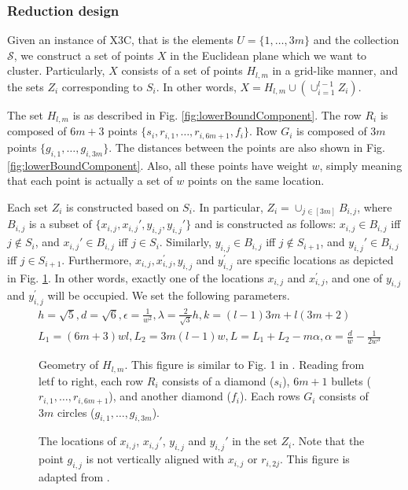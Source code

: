 \documentclass[letterpaper,12pt,titlepage,oneside,final]{book}
\newcommand{\mc}{\mathcal}
\begin{document}
\subsubsection{Reduction design}
Given an instance of X3C, that is the elements $U = \{1, \ldots, 3m\}$ and the collection $\mc S$, we construct a set of points $X$ in the Euclidean plane which we want to cluster. Particularly, $X$ consists of a set of points $H_{l,m}$ in a grid-like manner, and the sets $Z_i$ corresponding to $S_i$. In other words, $X = H_{l,m} \cup (\cup_{i=1}^{l-1} Z_i)$. 

The set $H_{l,m}$ is as described in Fig. \ref{fig:lowerBoundComponent}. The row $R_i$ is composed of $6m + 3$ points $\{s_i, r_{i, 1}, \ldots, r_{i, 6m+1}, f_i\}$. Row $G_i$ is composed of $3m$ points $\{g_{i,1}, \ldots, g_{i, 3m}\}$. The distances between the points are also shown in Fig. \ref{fig:lowerBoundComponent}. Also, all these points have weight $w$, simply meaning that each point is actually a set of $w$ points on the same location.

Each set $Z_i$ is constructed based on $S_i$. In particular, $Z_i = \cup_{j\in [3m]} B_{i,j}$, where $B_{i,j}$ is a subset of $\{x_{i,j},x_{i,j}',y_{i,j},y_{i,j}'\}$ and is constructed as follows: $x_{i,j} \in B_{i,j}$ iff $j \not\in S_i$, and $x_{i,j}' \in B_{i,j}$ iff $j \in S_i$. Similarly,  $y_{i,j} \in B_{i,j}$ iff $j \not\in S_{i+1}$, and $y_{i,j}' \in B_{i,j}$ iff $j \in S_{i+1}$. Furthermore, $x_{i, j}, x_{i,j}^\prime, y_{i,j}$ and $y_{i, j}^\prime$ are specific locations as depicted in Fig. \ref{fig:ZFig}. In other words, exactly one of the locations $x_{i,j}$ and $x_{i,j}^\prime$, and one of $y_{i,j}$ and $y_{i,j}^\prime$ will be occupied. We set the following parameters. 
\vspace{-0.1in}
\begin{align*}
&h = \sqrt{5}, d = \sqrt{6}, \epsilon = \frac{1}{w^2}, \lambda = \frac{2}{\sqrt{3}}h, k = (l-1)3m + l(3m+2)\\
& L_1 = (6m+3)wl, L_2 = 3m(l-1)w, L = L_1 + L_2 - m\alpha, \alpha = \frac{d}{w}-\frac{1}{2w^3}
\end{align*}


  \begin{figure}[!tbp]
  \centering
  \begin{minipage}[b]{0.49\textwidth}
    \resizebox{\linewidth}{!}{}
    \caption{Geometry of $H_{l,m}$. This figure is similar to Fig. 1 in \cite{vattani2009hardness}.  
    Reading from letf to right, each row $R_i$ consists of a diamond ($s_i$), $6m+1$ bullets ($r_{i,1},\ldots,r_{i,6m+1}$), and another diamond ($f_i$). Each rows $G_i$ consists of $3m$ circles ($g_{i,1}, \ldots, g_{i,3m}$).}
    \label{fig:lowerBoundComponent}
  \end{minipage}
  \hfill
  \begin{minipage}[b]{0.49\textwidth}
    
    \caption{The locations of $x_{i,j}$, $x_{i,j}'$, $y_{i,j}$ and $y_{i,j}'$ in the set $Z_i$. Note that the point $g_{i,j}$ is not vertically aligned with $x_{i, j}$ or $r_{i, 2j}$. This figure is adapted from \cite{vattani2009hardness}.}
    \label{fig:ZFig}
  \end{minipage}
\end{figure}
\end{document}
